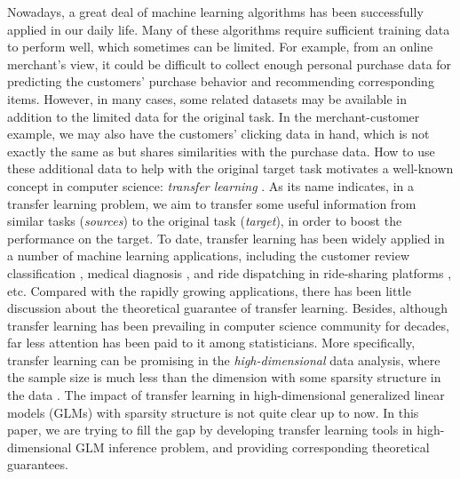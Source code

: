 \documentclass[12pt]{article}
\newcommand{\<}{\langle}
\renewcommand{\>}{\rangle}
\begin{document}
Nowadays, a great deal of machine learning algorithms has been successfully applied in our daily life. Many of these algorithms require sufficient training data to perform well, which sometimes can be limited. For example, from an online merchant's view, it could be difficult to collect enough personal purchase data for predicting the customers' purchase behavior and recommending corresponding items. However, in many cases, some related datasets may be available in addition to the limited data for the original task. In the merchant-customer example, we may also have the customers' clicking data in hand, which is not exactly the same as but shares similarities with the purchase data. How to use these additional data to help with the original target task motivates a well-known concept in computer science: \textit{transfer learning} \citep{torrey2010transfer, weiss2016survey}. As its name indicates, in a transfer learning problem, we aim to transfer some useful information from similar tasks (\textit{sources}) to the original task (\textit{target}), in order to boost the performance on the target. To date, transfer learning has been widely applied in a number of machine learning applications, including the customer review classification \citep{pan2009survey}, medical diagnosis \citep{hajiramezanali2018bayesian}, and ride dispatching in ride-sharing platforms \citep{wang2018deep}, etc. Compared with the rapidly growing applications, there has been little discussion about the theoretical guarantee of transfer learning. Besides, although transfer learning has been prevailing in computer science community for decades, far less attention has been paid to it among statisticians. More specifically, transfer learning can be promising in the \textit{high-dimensional} data analysis, where the sample size is much less than the dimension with some sparsity structure in the data \citep{tibshirani1996regression}. The impact of transfer learning in high-dimensional generalized linear models (GLMs) with sparsity structure is not quite clear up to now. In this paper, we are trying to fill the gap by developing  transfer learning tools in high-dimensional GLM inference problem, and providing corresponding theoretical guarantees.
\end{document}
